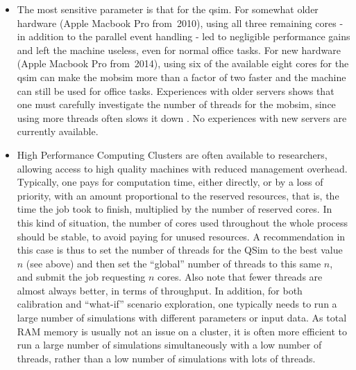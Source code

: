 \begin{itemize}
\item The most sensitive parameter is that for the \gls{qsim}.
  For somewhat older hardware (\eg Apple Macbook Pro from~2010), using all three remaining cores -  in addition to the parallel event handling - led to negligible performance gains and left the machine useless, even for normal office tasks.
  For new hardware (\eg Apple Macbook Pro from~2014), using six of the available eight cores for the \gls{qsim} can make the \gls{mobsim} more than a factor of two faster and the machine can still be used for office tasks.
  Experiences with older servers shows that one must carefully investigate the number of threads for the \gls{mobsim}, since using more threads often slows it down \citep{Dobler_PhDThesis_2013}.
  No experiences with new servers are currently available. 
  \item High Performance Computing Clusters are often available to researchers, allowing access to high quality machines with reduced management overhead. Typically, one pays for computation time, either directly, or by a loss of priority, with an amount proportional to the reserved resources, that is, the time the job took to finish, multiplied by the number of reserved cores. In this kind of situation, the number of cores used throughout the whole process should be stable, to avoid paying for unused resources. A recommendation in this case is thus to set the number of threads for the QSim to the best value $n$ (see above) and then set the ``global'' number of threads to this same $n$, and submit the job requesting $n$ cores.
	  Also note that fewer threads are almost always better, in terms of throughput.
	  In addition, for both calibration and ``what-if'' scenario exploration,
	  one typically needs to run a large number of simulations with different parameters or
	  input data.
	  As total RAM memory is usually not an issue on a cluster,
	  it is often more efficient to run a large number of simulations simultaneously
	  with a low number of threads, rather than a low number of simulations with lots of threads.

\end{itemize}



